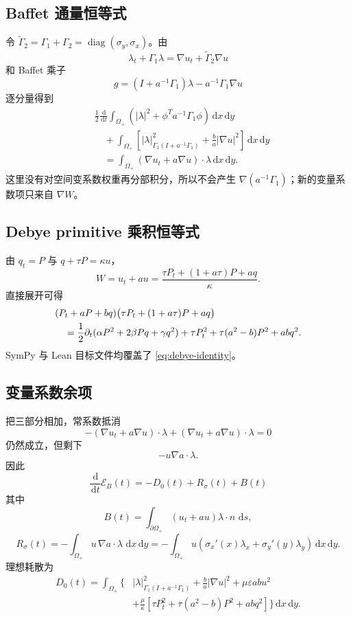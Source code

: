\documentclass[UTF8,a4paper,11pt]{ctexart}
\newcommand{\dd}{\,\mathrm d}
\newcommand{\sx}{\sigma_x}
\newcommand{\sy}{\sigma_y}
\newcommand{\Ecal}{\mathcal E}
\newcommand{\eps}{\varepsilon}
\newcommand{\diag}{\operatorname{diag}}
\begin{document}
\subsection{Baffet 通量恒等式}

令 \(\widetilde\Gamma_2=\Gamma_1+\Gamma_2=\diag(\sy,\sx)\)。由
\[
\lambda_t+\Gamma_1\lambda=\nabla u_t+\widetilde\Gamma_2\nabla u
\]
和 Baffet 乘子
\[
g=(I+a^{-1}\Gamma_1)\lambda-a^{-1}\Gamma_1\nabla u
\]
逐分量得到
\[
\begin{aligned}
&\frac12\frac{\dd}{\dd t}\int_{\Omega_+}
\left(|\lambda|^2+\phi^Ta^{-1}\Gamma_1\phi\right)\dd x\dd y\\
&\quad+\int_{\Omega_+}\left[
|\lambda|^2_{\Gamma_1(I+a^{-1}\Gamma_1)}
+\frac{b}{a}|\nabla u|^2
\right]\dd x\dd y\\
&\quad=\int_{\Omega_+}(\nabla u_t+a\nabla u)\cdot\lambda\dd x\dd y .
\end{aligned}
\]
这里没有对空间变系数权重再分部积分，所以不会产生
\(\nabla(a^{-1}\Gamma_1)\)；新的变量系数项只来自 \(\nabla W\)。

\subsection{Debye primitive 乘积恒等式}

由 \(q_t=P\) 与 \(q+\tau P=\kappa u\)，
\[
W=u_t+a u=\frac{\tau P_t+(1+a\tau)P+a q}{\kappa}.
\]
直接展开可得
\begin{align}
&(P_t+aP+bq)\bigl(\tau P_t+(1+a\tau)P+a q\bigr)\notag\\
&\quad =
\frac12\partial_t(\alpha P^2+2\beta Pq+\gamma q^2)
+\tau P_t^2+\tau(a^2-b)P^2+abq^2.
\label{eq:debye-identity}
\end{align}
SymPy 与 Lean 目标文件均覆盖了 \eqref{eq:debye-identity}。

\subsection{变量系数余项}

把三部分相加，常系数抵消
\[
-(\nabla u_t+a\nabla u)\cdot\lambda
+(\nabla u_t+a\nabla u)\cdot\lambda=0
\]
仍然成立，但剩下
\[
-u\nabla a\cdot\lambda.
\]
因此
\begin{equation}
\boxed{
\frac{\dd}{\dd t}\Ecal_B(t)=-D_0(t)+R_\sigma(t)+B(t)}
\label{eq:variable-identity}
\end{equation}
其中
\[
B(t)=\int_{\partial\Omega_+}(u_t+a u)\lambda\cdot n\,\dd s,
\]
\[
\boxed{
R_\sigma(t)=-\int_{\Omega_+}u\,\nabla a\cdot\lambda\,\dd x\dd y
=-\int_{\Omega_+}u(\sx'(x)\lambda_x+\sy'(y)\lambda_y)\dd x\dd y.}
\]
理想耗散为
\begin{equation}
\begin{aligned}
D_0(t)=\int_{\Omega_+}\{&
|\lambda|^2_{\Gamma_1(I+a^{-1}\Gamma_1)}
+\frac{b}{a}|\nabla u|^2+\mu\eps a b u^2\\
&+\frac{\mu}{\kappa}[\tau P_t^2+\tau(a^2-b)P^2+abq^2]\}\dd x\dd y.
\end{aligned}
\label{eq:D0}
\end{equation}
\end{document}
